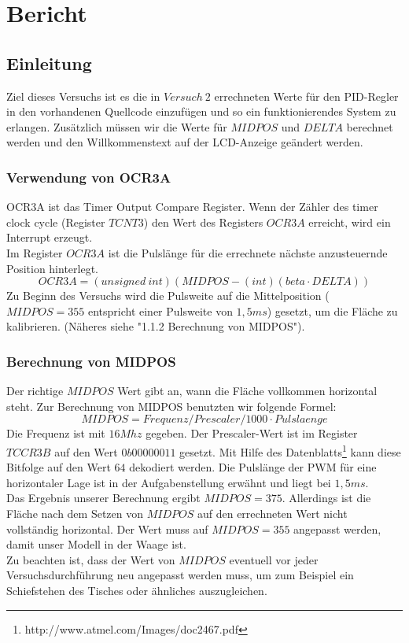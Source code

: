 \section{Bericht}

\subsection{Einleitung}
Ziel dieses Versuchs ist es die in $Versuch\ 2$ errechneten Werte für den PID-Regler in den vorhandenen Quellcode einzufügen und so ein funktionierendes System zu erlangen. Zusätzlich müssen wir die Werte für $MIDPOS$ und $DELTA$ berechnet werden und den Willkommenstext auf der LCD-Anzeige geändert werden. 

\subsubsection{Verwendung von OCR3A}
OCR3A ist das Timer Output Compare Register. Wenn der Zähler des timer clock cycle (Register $TCNT3$) den Wert des Registers $OCR3A$ erreicht, wird ein Interrupt erzeugt. \\
Im Register $OCR3A$ ist die Pulslänge für die errechnete nächste anzusteuernde Position hinterlegt.\\
\begin{equation}
OCR3A = (unsigned\ int) (MIDPOS - (int)(beta \cdot DELTA))
\end{equation}
Zu Beginn des Versuchs wird die Pulsweite auf die Mittelposition ($MIDPOS=355$ entspricht einer Pulsweite von $1,5ms$) gesetzt, um die Fläche zu kalibrieren. (Näheres siehe "1.1.2 Berechnung von MIDPOS").

\subsubsection{Berechnung von MIDPOS}
Der richtige $MIDPOS$ Wert gibt an, wann die Fläche vollkommen horizontal steht. Zur Berechnung von MIDPOS benutzten wir folgende Formel: \\
\begin{equation}
MIDPOS  = Frequenz / Prescaler / 1000 \cdot Pulslaenge
\end{equation}
Die Frequenz ist mit $16 Mhz$ gegeben. Der Prescaler-Wert ist im Register $TCCR3B$ auf den Wert $0b00000011$ gesetzt. Mit Hilfe des Datenblatts\footnote{http://www.atmel.com/Images/doc2467.pdf} kann diese Bitfolge auf den Wert $64$ dekodiert werden. Die Pulslänge der PWM für eine horizontaler Lage ist in der Aufgabenstellung erwähnt und liegt bei $1,5 ms$.\\
Das Ergebnis unserer Berechnung ergibt $MIDPOS = 375$. Allerdings ist die Fläche nach dem Setzen von $MIDPOS$ auf den errechneten Wert nicht vollständig horizontal. Der Wert muss auf $MIDPOS = 355$ angepasst werden, damit unser Modell in der Waage ist. \\ 
Zu beachten ist, dass der Wert von $MIDPOS$ eventuell vor jeder Versuchsdurchführung neu angepasst werden muss, um zum Beispiel ein Schiefstehen des Tisches oder ähnliches auszugleichen.

